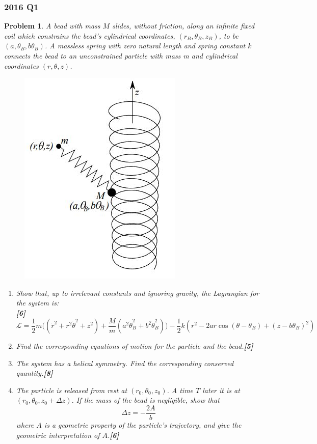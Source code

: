 \documentclass[a4paper]{article}
\theoremstyle{new}
\newtheorem{qns}{Problem}[section]
\begin{document}
\subsubsection*{2016 Q1}
\begin{qns}
A bead with mass $M$ slides, without friction, along an infinite fixed coil which constrains the bead’s cylindrical coordinates, $(r_B, \theta_B, z_B)$, to be $(a, \theta_B, b\theta_B)$. A massless spring with zero natural length and spring constant $k$ connects the bead to an unconstrained particle with mass m and cylindrical coordinates $(r, \theta, z)$. 
\begin{figure}[H]
    \centering
    \includegraphics[scale=0.5]{2016TP1Q1.JPG}
\end{figure}
\begin{enumerate}[label=(\alph*)]
\item Show that, up to irrelevant constants and ignoring gravity, the Lagrangian for the system is:\\ 

\hfill\textbf{[6]}
$$\mathcal{L}=\frac{1}{2}m\bigg((\dot{r}^2+r^2\dot{\theta}^2+z^2)+\frac{M}{m}(a^2\dot{\theta}_B^2+b^2\dot{\theta}_B^2)\bigg)-\frac{1}{2}k(r^2-2ar\cos(\theta-\theta_B)+(z-b\theta_B)^2)$$
\item Find the corresponding equations of motion for the particle and the bead.\hfill\textbf{[5]}
\item The system has a helical symmetry. Find the corresponding conserved quantity.\hfill\textbf{[8]}
\item The particle is released from rest at $(r_0, \theta_0, z_0)$. A time $T$ later it is at $(r_0, \theta_0, z_0 + \Delta z)$. If the mass of the bead is negligible, show that
$$\Delta z=-\frac{2A}{b}$$
where $A$ is a geometric property of the particle’s trajectory, and give the geometric interpretation of $A$.\hfill\textbf{[6]}
\end{enumerate}
\end{qns}
\end{document}
